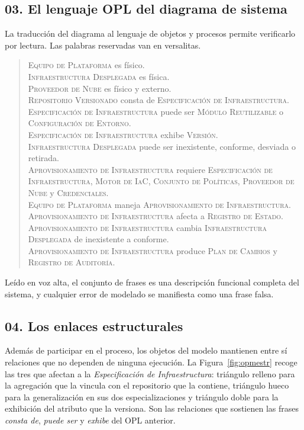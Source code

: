 \documentclass[11pt,letterpaper]{article}
\begin{document}
\subsection*{03. El lenguaje OPL del diagrama de sistema}

La traducción del diagrama al lenguaje de objetos y procesos permite
verificarlo por lectura. Las palabras reservadas van en versalitas.

\begin{quote}\small
\textsc{Equipo de Plataforma} es físico.\\
\textsc{Infraestructura Desplegada} es física.\\
\textsc{Proveedor de Nube} es físico y externo.\\
\textsc{Repositorio Versionado} consta de \textsc{Especificación de
Infraestructura}.\\
\textsc{Especificación de Infraestructura} puede ser \textsc{Módulo
Reutilizable} o \textsc{Configuración de Entorno}.\\
\textsc{Especificación de Infraestructura} exhibe \textsc{Versión}.\\
\textsc{Infraestructura Desplegada} puede ser inexistente, conforme, desviada
o retirada.\\
\textsc{Aprovisionamiento de Infraestructura} requiere \textsc{Especificación
de Infraestructura}, \textsc{Motor de IaC}, \textsc{Conjunto de Políticas},
\textsc{Proveedor de Nube} y \textsc{Credenciales}.\\
\textsc{Equipo de Plataforma} maneja \textsc{Aprovisionamiento de
Infraestructura}.\\
\textsc{Aprovisionamiento de Infraestructura} afecta a \textsc{Registro de
Estado}.\\
\textsc{Aprovisionamiento de Infraestructura} cambia \textsc{Infraestructura
Desplegada} de inexistente a conforme.\\
\textsc{Aprovisionamiento de Infraestructura} produce \textsc{Plan de Cambios}
y \textsc{Registro de Auditoría}.
\end{quote}

Leído en voz alta, el conjunto de frases es una descripción funcional completa
del sistema, y cualquier error de modelado se manifiesta como una frase falsa.

\subsection*{04. Los enlaces estructurales}

Además de participar en el proceso, los objetos del modelo mantienen entre sí
relaciones que no dependen de ninguna ejecución. La
Figura~\ref{fig:opmestr} recoge las tres que afectan a la \emph{Especificación
de Infraestructura}: triángulo relleno para la agregación que la vincula con
el repositorio que la contiene, triángulo hueco para la generalización en sus
dos especializaciones y triángulo doble para la exhibición del atributo que la
versiona. Son las relaciones que sostienen las frases \emph{consta de},
\emph{puede ser} y \emph{exhibe} del OPL anterior.
\end{document}
